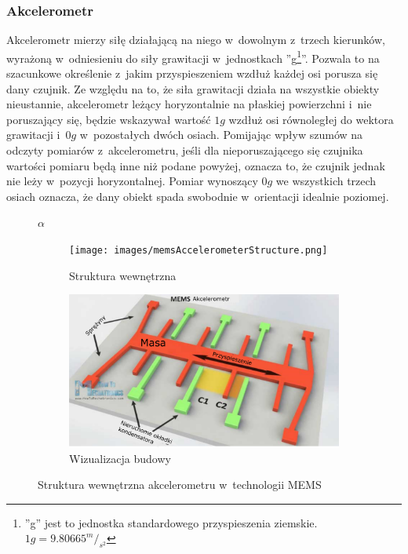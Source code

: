 \subsubsection*{Akcelerometr}
Akcelerometr mierzy siłę działającą na niego w~dowolnym z~trzech kierunków, wyrażoną w~odniesieniu do siły grawitacji w~jednostkach ''g\footnote{''g'' jest to jednostka standardowego przyspieszenia ziemskie. $1g =9.80665^m/_{s^2}$ }''. Pozwala to na szacunkowe określenie z~jakim przyspieszeniem wzdłuż każdej osi porusza się dany czujnik. Ze względu na to, że siła grawitacji działa na wszystkie obiekty nieustannie, akcelerometr leżący horyzontalnie na płaskiej powierzchni i~nie poruszający się, będzie wskazywał wartość $1g$ wzdłuż osi równoległej do wektora grawitacji i~$0g$ w~pozostałych dwóch osiach. Pomijając wpływ szumów na odczyty pomiarów z~akcelerometru, jeśli dla nieporuszającego się czujnika wartości pomiaru będą inne niż podane powyżej, oznacza to, że czujnik jednak nie leży w~pozycji horyzontalnej. Pomiar wynoszący $0g$ we wszystkich trzech osiach oznacza, że dany obiekt spada swobodnie w~orientacji idealnie poziomej.
					
\begin{savenotes}
	\begin{figure}[!htb]
		\captionsetup{singlelinecheck=off}
		$\alpha$
		\begin{subfigure}[b]{0.8\textwidth}
			\texttt{[image: images/memsAccelerometerStructure.png]}	
			\caption[Struktura wewnętrzna akcelerometru]{Struktura wewnętrzna}
			\label{fig:characteristics:imu:acc:memsA}
		\end{subfigure}
		\hfill												
		\begin{subfigure}[b]{0.8\textwidth}
			\includegraphics[width=\textwidth]{images/memsAccelerometerIdea.png}		
			\caption[Wizualizacja budowy akcelerometru]{Wizualizacja budowy}
			\label{fig:characteristics:imu:acc:memsB}
		\end{subfigure}				
		\caption{Struktura wewnętrzna akcelerometru w~technologii MEMS}
		\label{fig:characteristics:imu:acc:mems}
	\end{figure}
\end{savenotes}
																																											
